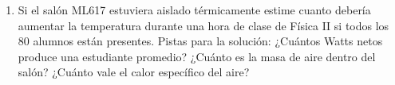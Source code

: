 \documentclass{article}
\begin{document}
\begin{enumerate}
\item{Si el sal\'on ML617 estuviera aislado t\'ermicamente estime
  cuanto deber\'ia aumentar la temperatura durante una hora de clase
  de F\'isica II si todos los 80 alumnos est\'an presentes. Pistas para
  la soluci\'on: ¿Cu\'antos Watts netos produce una estudiante promedio?
  ¿Cu\'anto es la masa de aire dentro del sal\'on? ¿Cuánto vale el
  calor específico del aire?}

\end{enumerate}
\end{document}
